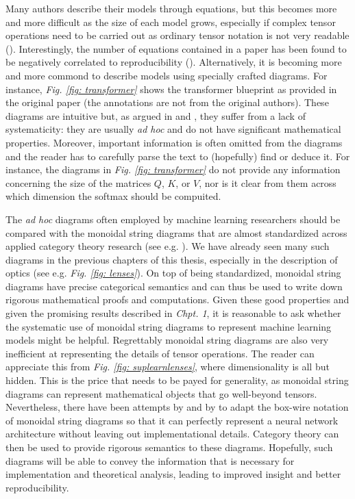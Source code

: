 \documentclass[11pt,a4paper,openright,twoside]{report}
\theoremstyle{plain}
\theoremstyle{definition}
\begin{document}
Many authors describe their models through equations, but this becomes more and more difficult as the size of each model grows, especially if complex tensor operations need to be carried out as ordinary tensor notation is not very readable (\cite{xu2023graph}). Interestingly, the number of equations contained in a paper has been found to be negatively correlated to reproducibility (\cite{raff2019step}). Alternatively, it is becoming more and more commond to describe models using specially crafted diagrams. For instance, \textit{Fig. \ref{fig: transformer}} shows the transformer blueprint as provided in the original paper \cite{vaswani2017attention} (the annotations are not from the original authors). These diagrams are intuitive but, as argued in \cite{abbott2024neural} and \cite{khatri2024anatomy}, they suffer from a lack of systematicity: they are usually \textit{ad hoc} and do not have significant mathematical properties.
Moreover, important information is often omitted from the diagrams and the reader has to carefully parse the text to (hopefully) find or deduce it. For instance, the diagrams in \textit{Fig. \ref{fig: transformer}} do not provide any information concerning the size of the matrices $Q$, $K$, or $V$, nor is it clear from them across which dimension the softmax should be compuited.

The \textit{ad hoc} diagrams often employed by machine learning researchers should be compared with the monoidal string diagrams that are almost standardized across applied category theory research (see e.g. \cite{bonchi2022string}). We have already seen many such diagrams in the previous chapters of this thesis, especially in the description of optics (see e.g. \textit{Fig. \ref{fig: lenses}}). On top of being standardized, monoidal string diagrams have precise categorical semantics and can thus be used to write down rigorous mathematical proofs and computations. Given these good properties and given the promising results described in \textit{Chpt. 1}, it is reasonable to ask whether the systematic use of monoidal string diagrams to represent machine learning models might be helpful. Regrettably monoidal string diagrams are also very inefficient at representing the details of tensor operations. The reader can appreciate this from \textit{Fig. \ref{fig: suplearnlenses}}, where dimensionality is all but hidden. This is the price that needs to be payed for generality, as monoidal string diagrams can represent mathematical objects that go well-beyond tensors. Nevertheless, there have been attempts by \cite{abbott2023robust} and by \cite{khatri2024anatomy} to adapt the box-wire notation of monoidal string diagrams so that it can perfectly represent a neural network architecture without leaving out implementational details. Category theory can then be used to provide rigorous semantics to these diagrams. Hopefully, such diagrams will be able to convey the information that is necessary for implementation and theoretical analysis, leading to improved insight and better reproducibility.
\end{document}
